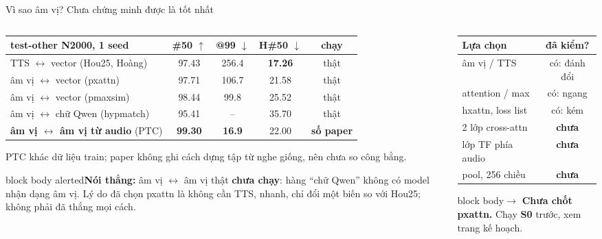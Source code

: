 \documentclass[aspectratio=169,xcolor=table]{beamer}
\newcommand{\hi}[1]{\textcolor{Primary}{\textbf{#1}}}
\newcommand{\bad}[1]{\textcolor{RiskRed}{\textbf{#1}}}
\newcommand{\good}[1]{\textcolor{GoodGreen}{\textbf{#1}}}
\newcommand{\ra}{$\rightarrow$}
\newcommand{\nbox}[2][block body]{\begin{beamercolorbox}[sep=0.45em,rounded=true]{#1}\footnotesize #2\end{beamercolorbox}}
\begin{document}
\begin{frame}{Vì sao âm vị? Chưa chứng minh được là tốt nhất}
\begin{columns}[T]
\begin{column}{0.60\textwidth}
\centering\scriptsize\setlength{\tabcolsep}{3pt}
\begin{tabular}{lcccc}
\toprule
test-other N2000, 1 seed & \#50 $\uparrow$ & @99 $\downarrow$ & H\#50 $\downarrow$ & chạy\\
\midrule
TTS $\leftrightarrow$ vector (Hou25, Hoàng) & 97.43 & 256.4 & \good{17.26} & thật\\
âm vị $\leftrightarrow$ vector (pxattn) & 97.71 & 106.7 & 21.58 & thật\\
âm vị $\leftrightarrow$ vector (pmaxsim) & 98.44 & 99.8 & 25.52 & thật\\
âm vị $\leftrightarrow$ chữ Qwen (hypmatch) & 95.41 & -- & 35.70 & thật\\
\textbf{âm vị $\leftrightarrow$ âm vị từ audio} (PTC) & \good{99.30} & \good{16.9} & 22.00 & \bad{số paper}\\
\bottomrule
\end{tabular}\par
\vspace{0.1cm}\raggedright
{\scriptsize\color{TextGray} PTC khác dữ liệu train; paper không ghi cách dựng tập từ nghe giống, nên chưa so công bằng.}\par
\vspace{0.15cm}
\nbox[block body alerted]{\textbf{Nói thẳng:} âm vị $\leftrightarrow$ âm vị thật \bad{chưa chạy}: hàng ``chữ Qwen'' không có model nhận dạng âm vị. Lý do đã chọn pxattn là không cần TTS, nhanh, chỉ đổi một biến so với Hou25; không phải đã thắng mọi cách.}
\end{column}
\begin{column}{0.36\textwidth}
\centering\scriptsize\setlength{\tabcolsep}{2pt}
\begin{tabular}{lc}
\toprule
Lựa chọn & đã kiểm?\\
\midrule
âm vị / TTS & có: đánh đổi\\
attention / max & có: ngang\\
hxattn, loss list & có: kém\\
2 lớp cross-attn & \bad{chưa}\\
lớp TF phía audio & \bad{chưa}\\
pool, 256 chiều & \bad{chưa}\\
\bottomrule
\end{tabular}\par
\vspace{0.2cm}\raggedright
\nbox{\ra{} \hi{Chưa chốt pxattn.} Chạy \textbf{S0} trước, xem trang kế hoạch.}
\end{column}
\end{columns}
\end{frame}
\end{document}
